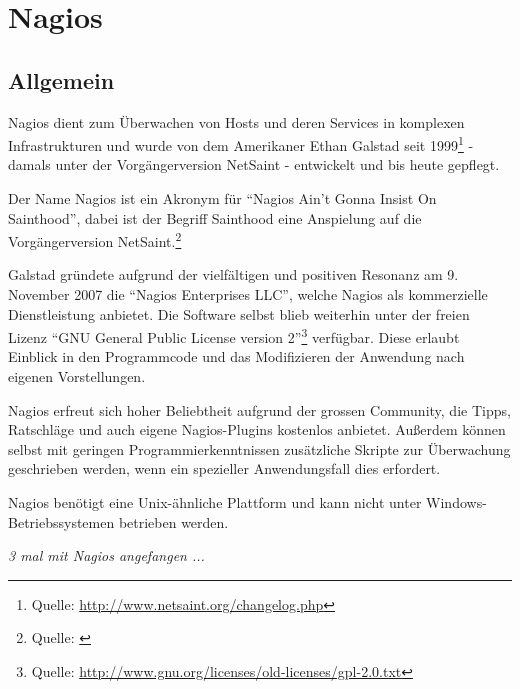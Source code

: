 \section{Nagios}

\subsection{Allgemein}
Nagios dient zum Überwachen von Hosts und deren Services in komplexen Infrastrukturen und wurde von dem Amerikaner Ethan Galstad seit 1999\footnote{Quelle: \url{http://www.netsaint.org/changelog.php}} - damals unter der Vorgängerversion NetSaint - entwickelt und bis heute gepflegt.

Der Name Nagios ist ein Akronym für "`Nagios Ain't Gonna Insist On Sainthood"', dabei ist der Begriff Sainthood eine Anspielung auf die Vorgängerversion NetSaint.\footnote{Quelle: \cite{NagiosFAQ}}

Galstad gründete aufgrund der vielfältigen und positiven Resonanz am 9. November 2007 die "`Nagios Enterprises LLC"', welche Nagios als kommerzielle Dienstleistung anbietet.
Die Software selbst blieb weiterhin unter der freien Lizenz "`GNU General Public License version 2"'\footnote{Quelle: \url{http://www.gnu.org/licenses/old-licenses/gpl-2.0.txt}} verfügbar.
Diese erlaubt Einblick in den Programmcode und das Modifizieren der Anwendung nach eigenen Vorstellungen.

Nagios erfreut sich hoher Beliebtheit aufgrund der grossen Community, die Tipps, Ratschläge und auch eigene Nagios-Plugins kostenlos anbietet.
Außerdem können selbst mit geringen Programmierkenntnissen zusätzliche Skripte zur Überwachung geschrieben werden, wenn ein spezieller Anwendungsfall dies erfordert.

Nagios benötigt eine Unix-ähnliche Plattform und kann nicht unter Windows-Betriebssystemen betrieben werden.

\textit{3 mal mit Nagios angefangen ...}







